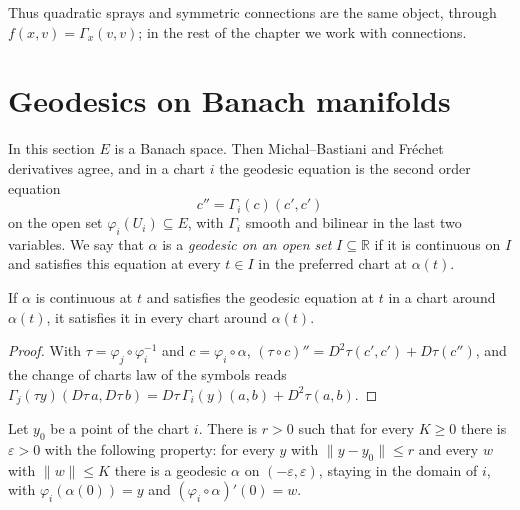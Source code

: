 Thus quadratic sprays and symmetric connections are the same object, through
$f(x, v) = \Gamma_x(v, v)$; in the rest of the chapter we work with connections.

\section{Geodesics on Banach manifolds}

In this section $E$ is a Banach space. Then Michal--Bastiani and Fr\'echet derivatives agree, and
in a chart $i$ the geodesic equation is the second order equation
\[
  c'' = \Gamma_i(c)(c', c')
\]
on the open set $\varphi_i(U_i) \subseteq E$, with $\Gamma_i$ smooth and bilinear in the last two
variables. We say that $\alpha$ is a \emph{geodesic on an open set} $I \subseteq \mathbb{R}$ if it is
continuous on $I$ and satisfies this equation at every $t \in I$ in the preferred chart at
$\alpha(t)$.

\begin{theorem}
  \label{thm:geodesic-eq-chart}
  \leanok
  If $\alpha$ is continuous at $t$ and satisfies the geodesic equation at $t$ in a chart around
  $\alpha(t)$, it satisfies it in every chart around $\alpha(t)$.
\end{theorem}

\begin{proof}
  \leanok
  With $\tau = \varphi_j \circ \varphi_i^{-1}$ and $c = \varphi_i \circ \alpha$,
  $(\tau \circ c)'' = D^2\tau(c', c') + D\tau(c'')$, and the change of charts law of the symbols
  reads $\Gamma_j(\tau y)(D\tau\, a, D\tau\, b) = D\tau\, \Gamma_i(y)(a, b) + D^2\tau(a, b)$.
\end{proof}

\begin{theorem}
  \label{thm:geodesic-existence}
  \leanok
  Let $y_0$ be a point of the chart $i$. There is $r > 0$ such that for every $K \ge 0$ there is
  $\varepsilon > 0$ with the following property: for every $y$ with $\|y - y_0\| \le r$ and every
  $w$ with $\|w\| \le K$ there is a geodesic $\alpha$ on $(-\varepsilon, \varepsilon)$, staying in
  the domain of $i$, with $\varphi_i(\alpha(0)) = y$ and $(\varphi_i \circ \alpha)'(0) = w$.
\end{theorem}

